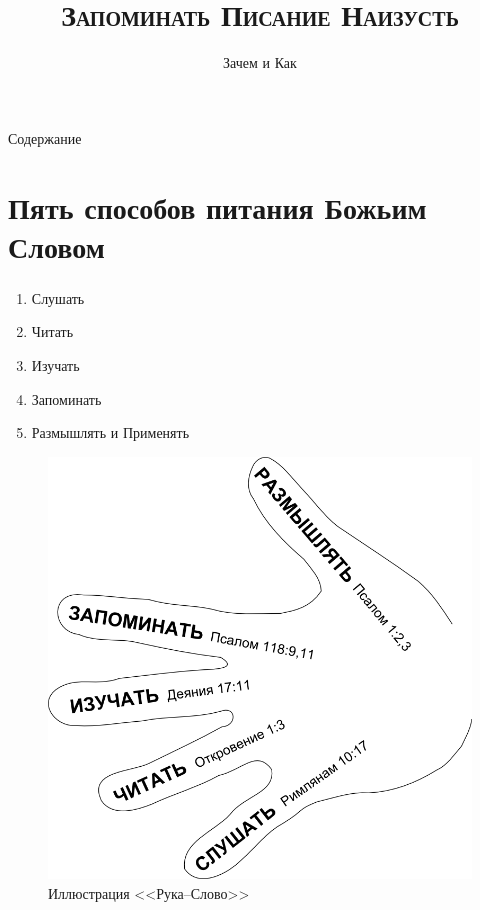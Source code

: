 \documentclass[t,aspectratio=169,14pt]{beamer}  %
\title{\textsc{\textbf{Запоминать Писание Наизусть}}}
\subtitle{Зачем и Как}
\author[Библейская Церковь СПб]{}
\date{}
\begin{document}
\frame[plain]{\titlepage}	%
\begin{frame}{Содержание}
    \tableofcontents[hideallsubsections]
\end{frame}
\section{Пять способов питания Божьим Словом}
\begin{frame}
	\frametitle{\insertsection} 
	\framesubtitle{\insertsubsection}
	
	\begin{multicols}{2}
	\begin{enumerate}
		\item Слушать \pause
		\item Читать \pause
		\item Изучать \pause
		\item Запоминать \pause
		\item Размышлять и Применять
	\end{enumerate}
	\begin{figure}
		\includegraphics[height=0.6\textheight]{hand-word-ru-800}
		\caption{Иллюстрация <<Рука--Слово>>}
	\end{figure}	
	\end{multicols}
\end{frame}
\end{document}
